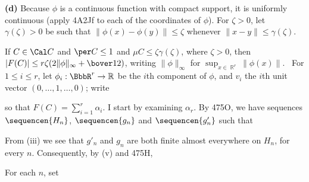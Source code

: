{\medskip

{\bf (d)} Because $\phi$ is a continuous function with compact support,
it is uniformly continuous (apply 4A2Jf to each of the coordinates of
$\phi$).   For $\zeta>0$, let $\gamma(\zeta)>0$ be such that
$\|\phi(x)-\phi(y)\|\le\zeta$ whenever $\|x-y\|\le\gamma(\zeta)$.

If $C\in\Cal C$ and $\per C\le 1$ and $\mu C\le\zeta\gamma(\zeta)$,
where $\zeta>0$, then
$|F(C)|\le r\zeta(2\|\phi\|_{\infty}+\bover12)$, writing
$\|\phi\|_{\infty}$ for $\sup_{x\in\BbbR^r}\|\phi(x)\|$.
\Prf\ For $1\le i\le r$, let $\phi_i:\BbbR^r\to\Bbb R$ be the $i$th
component of $\phi$, and $v_i$ the $i$th unit vector
$(0,\ldots,1,\ldots,0)$;  write


\noindent so that $F(C)=\sum_{i=1}^r\alpha_i$.   I start by examining
$\alpha_r$.   By 475O, we have sequences $\sequencen{H_n}$,
$\sequencen{g_n}$ and $\sequencen{g'_n}$ such that


\noindent From (iii) we see that $g'_n$ and $g_n$ are both finite almost
everywhere on $H_n$, for every $n$.   Consequently, by (v) and 475H,


\noindent For each $n$, set

}
